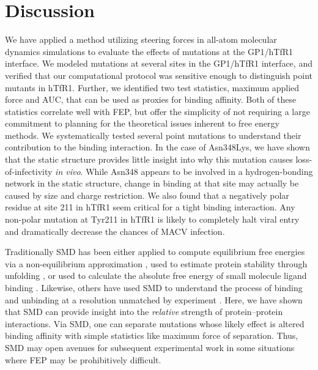 \documentclass[12pt]{article}
\begin{document}
\section{Discussion}

We have applied a method utilizing steering forces in all-atom molecular dynamics simulations to evaluate the effects of mutations at the GP1/hTfR1 interface. We modeled mutations at several sites in the GP1/hTfR1 interface, and verified that our computational protocol was sensitive enough to distinguish point mutants in hTfR1. Further, we identified two test statistics, maximum applied force and AUC, that can be used as proxies for binding affinity. Both of these statistics correlate well with FEP, but offer the simplicity of not requiring a large commitment to planning for the theoretical issues inherent to free energy methods. We systematically tested several point mutations to understand their contribution to the binding interaction. In the case of Asn348Lys, we have shown that the static structure provides little insight into why this mutation causes loss-of-infectivity \textit{in vivo}. While Asn348 appears to be involved in a hydrogen-bonding network in the static structure, change in binding at that site may actually be caused by size and charge restriction. We also found that a negatively polar residue at site 211 in hTfR1 seem critical for a tight binding interaction. Any non-polar mutation at Tyr211 in hTfR1 is likely to completely halt viral entry and dramatically decrease the chances of MACV infection.

Traditionally SMD has been either applied to compute equilibrium free energies via a non-equilibrium approximation \citep{Park2003,Park2004,Giorgino2011}, used to estimate protein stability through unfolding \citep{Lu1999}, or used to calculate the absolute free energy of small molecule ligand binding \citep{Dixit2001}. Likewise, others have used SMD to understand the process of binding and unbinding at a resolution unmatched by experiment \citep{Cuendet2011,Giorgino2011}. Here, we have shown that SMD can provide insight into the \textit{relative} strength of protein--protein interactions. Via SMD, one can separate mutations whose likely effect is altered binding affinity with simple statistics like maximum force of separation. Thus, SMD may open avenues for subsequent experimental work in some situations where FEP may be prohibitively difficult.
\end{document}
